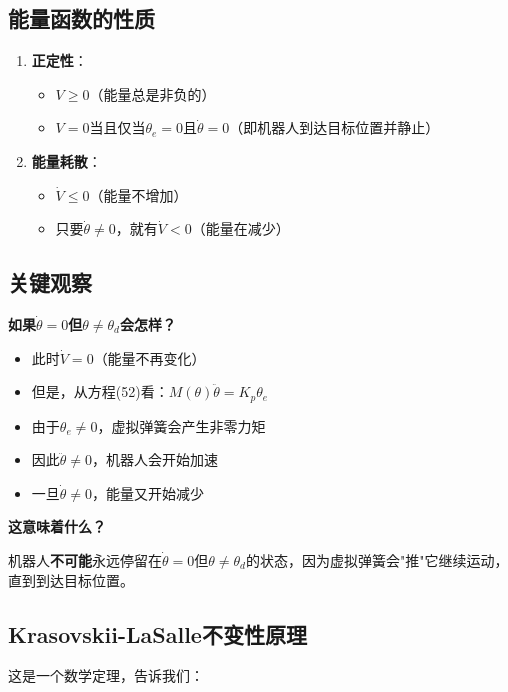 \documentclass{article}
\begin{document}
\subsection{能量函数的性质}

\begin{enumerate}
\item \textbf{正定性}：
\begin{itemize}
\item $V \geq 0$（能量总是非负的）
\item $V = 0$当且仅当$\theta_e = 0$且$\dot{\theta} = 0$（即机器人到达目标位置并静止）
\end{itemize}

\item \textbf{能量耗散}：
\begin{itemize}
\item $\dot{V} \leq 0$（能量不增加）
\item 只要$\dot{\theta} \neq 0$，就有$\dot{V} < 0$（能量在减少）
\end{itemize}
\end{enumerate}

\subsection{关键观察}

\textbf{如果$\dot{\theta} = 0$但$\theta \neq \theta_d$会怎样？}

\begin{itemize}
\item 此时$\dot{V} = 0$（能量不再变化）
\item 但是，从方程(52)看：$M(\theta)\ddot{\theta} = K_p\theta_e$
\item 由于$\theta_e \neq 0$，虚拟弹簧会产生非零力矩
\item 因此$\ddot{\theta} \neq 0$，机器人会开始加速
\item 一旦$\dot{\theta} \neq 0$，能量又开始减少
\end{itemize}

\textbf{这意味着什么？}

机器人\textbf{不可能}永远停留在$\dot{\theta} = 0$但$\theta \neq \theta_d$的状态，因为虚拟弹簧会"推"它继续运动，直到到达目标位置。

\subsection{Krasovskii-LaSalle不变性原理}

这是一个数学定理，告诉我们：
\end{document}

